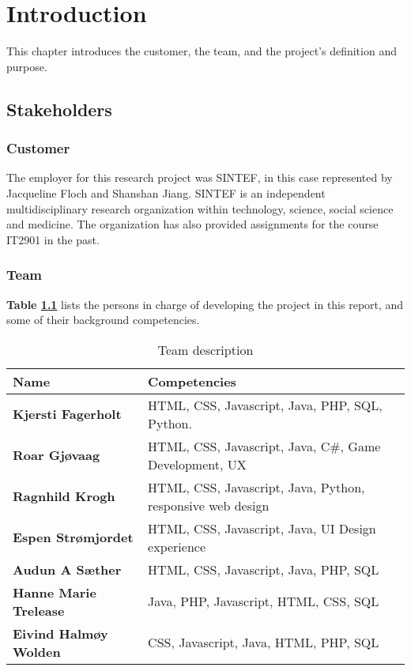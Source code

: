 
\chapter{Introduction}

This chapter introduces the customer, the team, and the project's definition and purpose.

\section{Stakeholders}

\subsection{Customer}

The employer for this research project was SINTEF, in this case represented by Jacqueline Floch and Shanshan Jiang. SINTEF is an independent multidisciplinary research organization within technology, science, social science and medicine. The organization has also provided assignments for the course IT2901 in the past.

\subsection{Team}

\textbf{Table \ref{Tab:team}} lists the persons in charge of developing the project in this report, and some of their background competencies.

\begin{table}[!h]
	\begin{center}
		\caption{Team description}
		\label{Tab:team}
		\begin{tabular}{  l  l }
			\textbf{Name} & \textbf{Competencies} \\ \hline
			\textbf{Kjersti Fagerholt} & HTML, CSS, Javascript, Java, PHP, SQL, Python. \\ 
			\textbf{Roar Gjøvaag} &  HTML, CSS, Javascript, Java, C\#, Game Development, UX \\ 
			\textbf{Ragnhild Krogh} & HTML, CSS, Javascript, Java, Python, responsive web design \\ 
			\textbf{Espen Strømjordet} & HTML, CSS, Javascript, Java,
			UI Design experience \\ 
			\textbf{Audun A Sæther} & HTML, CSS, Javascript, Java, PHP, SQL \\ 
			\textbf{Hanne Marie Trelease} & Java, PHP, Javascript, HTML, CSS, SQL \\ 
			\textbf{Eivind Halmøy Wolden} & CSS, Javascript, Java, HTML, PHP, SQL \\ 
		\end{tabular}
	\end{center}
\end{table}

